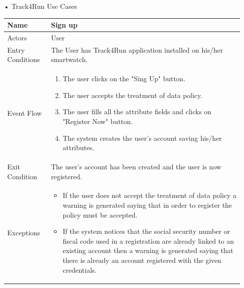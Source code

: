 \begin{enumerate}
\FloatBarrier
\item[•]{\Large Track4Run Use Cases}
\begin{table}[h]
\begin{tabular}{|l|p{}|}
\hline
Name             & Sign up \\ \hline
Actors           & User  \\ \hline
Entry Conditions & The User has Track4Run application installed on his/her smartwatch.    \\ \hline
Event Flow       & \begin{enumerate}
            \item The user clicks on the "Sing Up" button.
            \item The user accepts the treatment of data policy.
            \item The user fills all the attribute fields and clicks on "Register Now" button.
            \item The system creates the user's account saving his/her attributes.
        \end{enumerate}\\ \hline
Exit Condition   & The user's account has been created and the user is now registered.\\ \hline
Exceptions       & \begin{itemize}
\item If the user does not accept the treatment of data policy a warning is generated saying that in order to register the policy must be accepted.
\item If the system notices that the social security number or fiscal code used in a registration are already linked to an existing account then a warning is generated saying that there is already an account registered with the given credentials.
\end{itemize}\\ \hline
\end{tabular}
\end{table}
\FloatBarrier


\end{enumerate}
